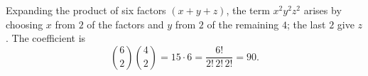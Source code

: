 Expanding the product of six factors $(x+y+z)$, the term $x^2y^2z^2$ arises by choosing $x$ from $2$ of the factors and $y$ from $2$ of the remaining $4$; the last $2$ give $z$. The coefficient is
\[\binom62\binom42=15\cdot6=\dfrac{6!}{2!\,2!\,2!}=\boxed{90}.\]

